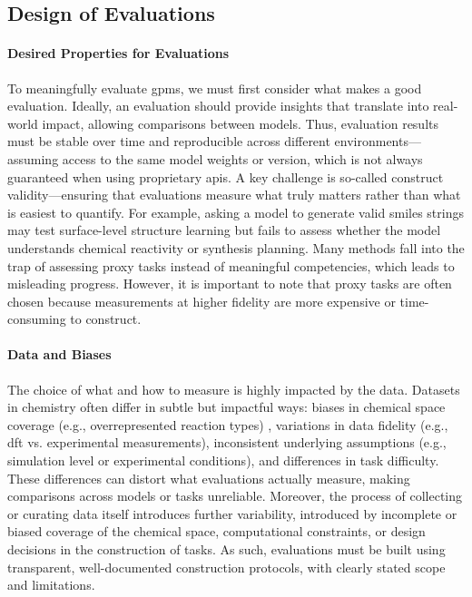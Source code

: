 \subsection{Design of Evaluations}
\label{sec:eval_design}

\paragraph{Desired Properties for Evaluations}
To meaningfully evaluate \glspl{gpm}, we must first consider what makes a good evaluation. 
Ideally, an evaluation should provide insights that translate into real-world impact, allowing comparisons between models. 
Thus, evaluation results must be stable over time and reproducible across different environments---assuming access to the same model weights or version, which is not always guaranteed when using proprietary \glspl{api}. \autocite{Ollion2024dangers}
A key challenge is so-called construct validity---ensuring that evaluations measure what truly matters rather than what is easiest to quantify. For example, asking a model to generate valid \gls{smiles} strings may test surface-level structure learning but fails to assess whether the model understands chemical reactivity or synthesis planning.
Many methods fall into the trap of assessing proxy tasks instead of meaningful competencies, which leads to misleading progress. 
However, it is important to note that proxy tasks are often chosen because measurements at higher fidelity are more expensive or time-consuming to construct. 


\paragraph{Data and Biases} The choice of what and how to measure is highly impacted by the data. 
Datasets in chemistry often differ in subtle but impactful ways: biases in chemical space coverage (e.g., overrepresented reaction types) \autocite{Jia_2019anthropogenic,Fujinuma_2022why}, variations in data fidelity (e.g., \gls{dft} vs. experimental measurements),  inconsistent underlying assumptions (e.g., simulation level or experimental conditions), and differences in task difficulty. 
These differences can distort what evaluations actually measure, making comparisons across models or tasks unreliable. \autocite{peng2024survey}
Moreover, the process of collecting or curating data itself introduces further variability, introduced by incomplete or biased coverage of the chemical space, computational constraints, or design decisions in the construction of tasks. 
As such, evaluations must be built using transparent, well-documented construction protocols, with clearly stated scope and limitations.


